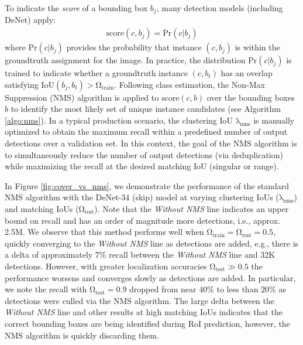 \documentclass[10pt,twocolumn,letterpaper]{article}
\begin{document}
To indicate the \textit{score} of a bounding box $b_j$, many detection models (including DeNet\cite{denet}) apply: 
\begin{gather}
\mathrm{score}(c,b_j) = \mathrm{Pr}(c | b_j)  
\label{eq:old_fitness}
\end{gather}
where $\mathrm{Pr}(c|b_j)$ provides the probability that instance $(c,b_j)$ is within the groundtruth assignment for the image. In practice, the distribution $\mathrm{Pr}(c | b_j)$ is trained to indicate whether a groundtruth instance $(c,b_t)$ has an overlap satisfying $\mathrm{IoU}(b_j, b_t) > \bm{\mathrm{\Omega_{train}}}$. Following class estimation, the Non-Max Suppression (NMS) algorithm is applied to $\mathrm{score}(c,b)$ over the bounding boxes $b$ to identify the most likely set of unique instance candidates (see Algorithm \ref{algo:nms}). In a typical production scenario, the clustering IoU $\bm{\mathrm{\lambda_{nms}}}$ is manually optimized to obtain the maximum recall within a predefined number of output detections over a validation set. In this context, the goal of the NMS algorithm is to simultaneously reduce the number of output detections (via deduplication) while maximizing the recall at the desired matching IoU (singular or range).

In Figure \ref{fig:cover_vs_nms}, we demonstrate the performance of the standard NMS algorithm with the DeNet-34 (skip) model at varying clustering IoUs ($\bm{\mathrm{\lambda_{nms}}}$) and matching IoUs ($\bm{\mathrm{\Omega_{test}}}$). Note that the \textit{Without NMS} line indicates an upper bound on recall and has an order of magnitude more detections, i.e., approx. 2.5M. We observe that this method performs well when $\bm{\mathrm{\Omega_{train}}}=\bm{\mathrm{\Omega_{test}}}=0.5$, quickly converging to the \textit{Without NMS} line as detections are added, e.g., there is a delta of approximately 7\% recall between the \textit{Without NMS} line and 32K detections. However, with greater localization accuracies $\bm{\mathrm{\Omega_{test}}} \gg 0.5$ the performance worsens and converges slowly as detections are added. In particular, we note the recall with $\bm{\mathrm{\Omega_{test}}}=0.9$ dropped from near 40\% to less than $20\%$ as detections were culled via the NMS algorithm. The large delta between the \textit{Without NMS} line and other results at high matching IoUs indicates that the correct bounding boxes are being identified during RoI prediction, however, the NMS algorithm is quickly discarding them. 
\end{document}
